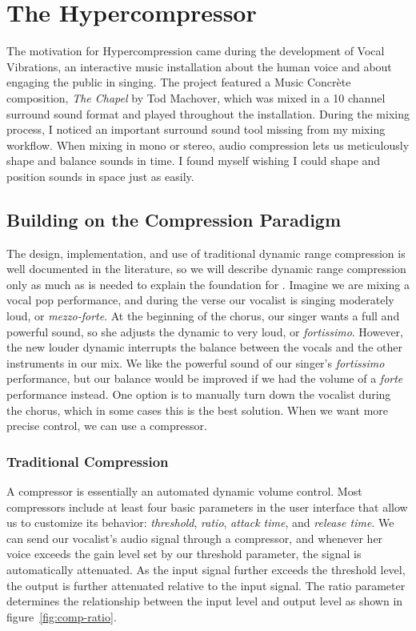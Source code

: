 \chapter{The Hypercompressor}
\label{ch:hypercompressor}

The motivation for Hypercompression came during the development of
Vocal Vibrations, an interactive music installation about the human
voice and about engaging the public in singing.\cite{Holbrow2014} The
project featured a Music Concr\`{e}te composition, \textit{The Chapel}
by Tod Machover, which was mixed in a 10 channel surround sound
format and played throughout the installation. During the mixing
process, I noticed an important surround sound tool missing from my
mixing workflow. When mixing in mono or stereo, audio
compression lets us meticulously shape and balance sounds in
time. I found myself wishing I could shape and position sounds in
space just as easily.

\section{Building on the Compression Paradigm}
The design, implementation, and use of traditional dynamic range
compression is well documented in the
literature,\cite[]{Giannoulis2012,Case2007,Deruty2014} so we will
describe dynamic range compression only as much as is needed to
explain the foundation for \thesis. Imagine we are mixing a vocal pop
performance, and during the verse our vocalist is singing moderately
loud, or \textit{mezzo-forte}. At the beginning of the chorus, our
singer wants a full and powerful sound, so she adjusts the dynamic to
very loud, or \textit{fortissimo}. However, the new louder dynamic
interrupts the balance between the vocals and the other instruments in
our mix. We like the powerful sound of our singer's
\textit{fortissimo} performance, but our balance would be improved if
we had the volume of a \textit{forte} performance instead. One option
is to manually turn down the vocalist during the chorus, which in some
cases this is the best solution. When we want more precise control, we
can use a compressor.

\subsection{Traditional Compression}
\label{sec:trad-compr}
A compressor is essentially an automated dynamic volume control.  Most
compressors include at least four basic parameters in the user
interface that allow us to customize its behavior: \textit{threshold},
\textit{ratio}, \textit{attack time}, and \textit{release time}.  We
can send our vocalist's audio signal through a compressor, and
whenever her voice exceeds the gain level set by our threshold
parameter, the signal is automatically attenuated. As the input signal
further exceeds the threshold level, the output is further attenuated
relative to the input signal. The ratio parameter determines the
relationship between the input level and output level as shown in
figure~\ref{fig:comp-ratio}.

